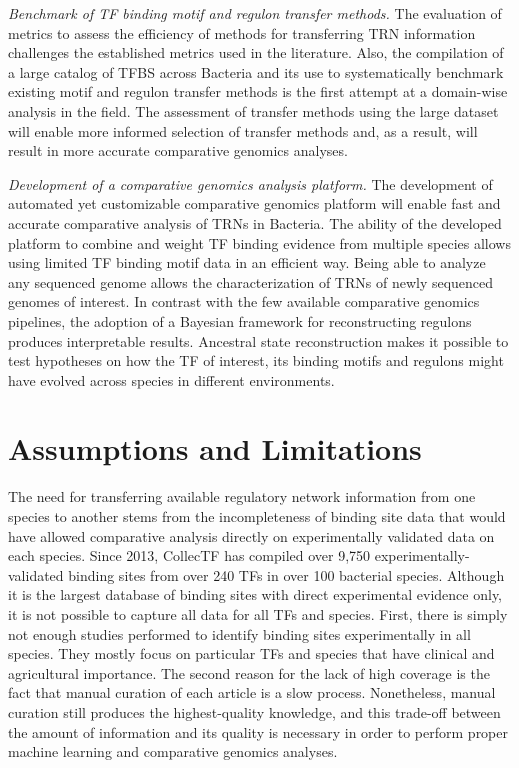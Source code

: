 \textit{Benchmark of TF binding motif and regulon transfer methods.} The
evaluation of metrics to assess the efficiency of methods for transferring TRN
information challenges the established metrics used in the literature. Also,
the compilation of a large catalog of TFBS across Bacteria and its use to
systematically benchmark existing motif and regulon transfer methods is the
first attempt at a domain-wise analysis in the field. The assessment of
transfer methods using the large dataset will enable more informed selection of
transfer methods and, as a result, will result in more accurate comparative
genomics analyses.

\textit{Development of a comparative genomics analysis platform.} The
development of automated yet customizable comparative genomics platform will
enable fast and accurate comparative analysis of TRNs in Bacteria. The ability
of the developed platform to combine and weight TF binding evidence from
multiple species allows using limited TF binding motif data in an efficient
way. Being able to analyze any sequenced genome allows the characterization of
TRNs of newly sequenced genomes of interest. In contrast with the few available
comparative genomics pipelines, the adoption of a Bayesian framework for
reconstructing regulons produces interpretable results. Ancestral state
reconstruction makes it possible to test hypotheses on how the TF of interest,
its binding motifs and regulons might have evolved across species in different
environments.

\section{Assumptions and Limitations}

The need for transferring available regulatory network information from one
species to another stems from the incompleteness of binding site data that
would have allowed comparative analysis directly on experimentally validated
data on each species. Since 2013, CollecTF has compiled over 9,750
experimentally-validated binding sites from over 240 TFs in over 100 bacterial
species. Although it is the largest database of binding sites with direct
experimental evidence only, it is not possible to capture all data for all TFs
and species. First, there is simply not enough studies performed to identify
binding sites experimentally in all species. They mostly focus on particular
TFs and species that have clinical and agricultural importance. The second reason
for the lack of high coverage is the fact that manual curation of each article
is a slow process. Nonetheless, manual curation still produces the highest-quality
knowledge, and this trade-off between the amount of information and its quality
is necessary in order to perform proper machine learning and comparative
genomics analyses.

